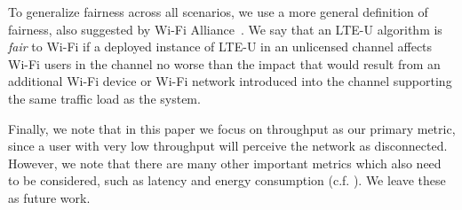 To generalize fairness across all scenarios, we use a more general definition of fairness, also suggested by Wi-Fi Alliance~\cite{wifialliance}.
We say that an LTE-U algorithm is {\em fair} to Wi-Fi if a deployed instance of LTE-U in an unlicensed channel affects Wi-Fi users in the channel no worse than the impact that would result from an additional Wi-Fi device or Wi-Fi network introduced into the channel supporting the same traffic load as the system. 

Finally, we note that in this paper we focus on throughput as our primary metric, since a user with very low throughput will perceive the network as disconnected. However, we note that there are many other important metrics which also need to be considered, such as latency and energy consumption (c.f. \cite{google, cablelabs}). We leave these as future work. 



